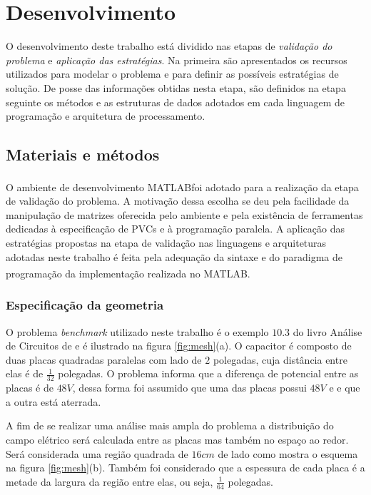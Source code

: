 \documentclass[
    12pt,               %
    openright,          %
    oneside,
    a4paper,            %
    english,            %
    french,             %
    spanish,            %
    brazil              %
    ]{abntex2}
\newcommand{\matlab}{MATLAB\textsuperscript{\textregistered}}
\begin{document}
\chapter{Desenvolvimento}

O desenvolvimento deste trabalho está  dividido nas etapas de \textit{validação do problema} e \textit{aplicação das estratégias}. Na primeira são apresentados os recursos utilizados para modelar o problema e para definir as possíveis estratégias de solução. De posse das informações obtidas nesta etapa, são definidos na etapa seguinte os métodos e as estruturas de dados adotados em cada linguagem de programação e arquitetura de processamento.

\section{Materiais e métodos}
O ambiente de desenvolvimento \matlab foi adotado para a realização da etapa de validação do problema. A motivação dessa escolha se deu pela facilidade da manipulação de matrizes oferecida pelo ambiente e pela existência de ferramentas dedicadas à especificação de PVCs e à programação paralela.
A aplicação das estratégias propostas na etapa de validação nas linguagens e arquiteturas adotadas neste trabalho é feita pela adequação da sintaxe e do paradigma de programação da implementação realizada no \matlab. 

\subsection{Especificação da geometria}
O problema \textit{benchmark} utilizado neste trabalho é o exemplo $10.3$ do livro Análise de Circuitos de  e é ilustrado na figura \ref{fig:mesh}{(a)}. O capacitor é composto de duas placas quadradas paralelas com lado de $2$ polegadas, cuja distância entre elas é de $\frac{1}{32}$ polegadas. O problema informa que a diferença de potencial entre as placas é de $48V$, dessa forma foi assumido que uma das placas possui $48V$ e e que a outra está aterrada.

A fim de se realizar uma análise mais ampla do problema a distribuição do campo elétrico será calculada entre as placas mas também no espaço ao redor. Será considerada uma região quadrada de $16cm$ de lado como mostra o esquema na figura \ref{fig:mesh}{(b)}. Também foi considerado que a espessura de cada placa é a metade da largura da região entre elas, ou seja, $\frac{1}{64}$ polegadas.
\end{document}
